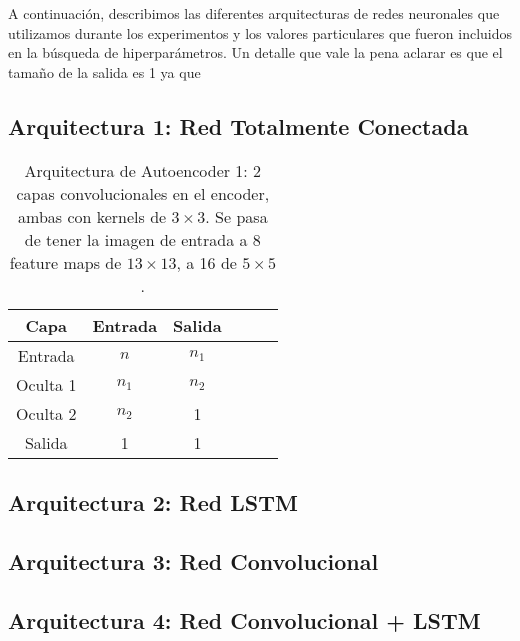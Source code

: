 \documentclass[../../main.tex]{subfiles}
\begin{document}
A continuación, describimos las diferentes arquitecturas de redes neuronales que
utilizamos durante los experimentos y los valores particulares que fueron incluidos en la
búsqueda de hiperparámetros. Un detalle que vale la pena aclarar es que el tamaño de la
salida es 1 ya que 

\subsection{Arquitectura 1: Red Totalmente Conectada}
\begin{table}[h!]
    \centering
    \begin{tabular}{|c|c|c|c|c|c|}
        \hline\hline
        \textbf{Capa} & \textbf{Entrada} & \textbf{Salida} \\ \hline\hline
        Entrada  & \(n\)   & \(n_1\) \\ \hline
        Oculta 1 & \(n_1\) & \(n_2\) \\ \hline
        Oculta 2 & \(n_2\) & 1   \\ \hline
        Salida   & 1       & 1   \\ \hline
        \hline
    \end{tabular}
    \caption{Arquitectura de Autoencoder 1: 2 capas convolucionales en el encoder, ambas con kernels de $3\times3$. Se pasa de tener la imagen de entrada a 8 feature maps de $13\times13$, a 16 de $5\times5$.}
    \label{tab:dense}
\end{table}

\subsection{Arquitectura 2: Red LSTM}

\subsection{Arquitectura 3: Red Convolucional}

\subsection{Arquitectura 4: Red Convolucional + LSTM}
\end{document}
